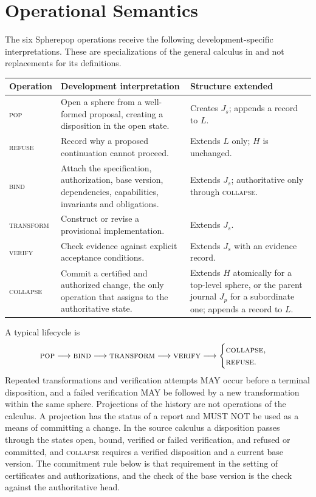 \documentclass[11pt]{article}
\theoremstyle{remark}
\newcommand{\POP}{\textsc{pop}}
\newcommand{\REFUSE}{\textsc{refuse}}
\newcommand{\BIND}{\textsc{bind}}
\newcommand{\TRANSFORM}{\textsc{transform}}
\newcommand{\VERIFY}{\textsc{verify}}
\newcommand{\COLLAPSE}{\textsc{collapse}}
\begin{document}
\section{Operational Semantics}\label{sec:ops}

The six Spherepop operations receive the following development-specific interpretations. These are specializations of the general calculus in \cite{duc} and not replacements for its definitions.

\begin{center}
\small
\begin{tabular}{@{}>{\raggedright\arraybackslash}p{}>{\raggedright\arraybackslash}p{}>{\raggedright\arraybackslash}p{}@{}}
\toprule
Operation & Development interpretation & Structure extended\\
\midrule
\POP & Open a sphere from a well-formed proposal, creating a disposition in the open state. & Creates $J_s$; appends a record to $L$.\\
\REFUSE & Record why a proposed continuation cannot proceed. & Extends $L$ only; $H$ is unchanged.\\
\BIND & Attach the specification, authorization, base version, dependencies, capabilities, invariants and obligations. & Extends $J_s$; authoritative only through \COLLAPSE.\\
\TRANSFORM & Construct or revise a provisional implementation. & Extends $J_s$.\\
\VERIFY & Check evidence against explicit acceptance conditions. & Extends $J_s$ with an evidence record.\\
\COLLAPSE & Commit a certified and authorized change, the only operation that assigns to the authoritative state. & Extends $H$ atomically for a top-level sphere, or the parent journal $J_p$ for a subordinate one; appends a record to $L$.\\
\bottomrule
\end{tabular}
\end{center}

A typical lifecycle is
\[
\POP\longrightarrow\BIND\longrightarrow\TRANSFORM\longrightarrow\VERIFY\longrightarrow
\begin{cases}\COLLAPSE,\\ \REFUSE.\end{cases}
\]
Repeated transformations and verification attempts MAY occur before a terminal disposition, and a failed verification MAY be followed by a new transformation within the same sphere. Projections of the history are not operations of the calculus. A projection has the status of a report and MUST NOT be used as a means of committing a change. In the source calculus a disposition passes through the states open, bound, verified or failed verification, and refused or committed, and \COLLAPSE{} requires a verified disposition and a current base version. The commitment rule below is that requirement in the setting of certificates and authorizations, and the check of the base version is the check against the authoritative head.
\end{document}

